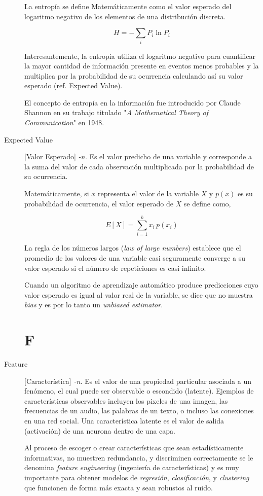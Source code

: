 \documentclass[twoside]{book}
\newcommand{\ditem}[1]{\item[#1] \markboth{\footnotesize \textbf{#1}}{\footnotesize \textbf{#1}}}
\begin{document}
\begin{multicols}{2}
\begin{description}
La entropía se define Matemáticamente como el valor esperado del logaritmo negativo de los elementos de una distribución discreta. 

$$H=-\sum _{i}P_{i}\ln {P_{i}}$$

Interesantemente, la entropía utiliza el logaritmo negativo para cuantificar la mayor cantidad de información presente en eventos menos probables y la multiplica por la probabilidad de su ocurrencia calculando así su valor esperado (ref. Expected Value).
  
El concepto de entropía en la información fue introducido por Claude Shannon en su trabajo titulado "\textit{A Mathematical Theory of Communication}" en 1948.

\ditem{Expected Value} [Valor Esperado] \textit{-n.} Es el valor predicho de una variable y corresponde a la suma del valor de cada observación multiplicada por la probabilidad de su ocurrencia.

Matemáticamente, si $x$ representa el valor de la variable $X$ y $p(x)$ es su probabilidad de ocurrencia, el valor esperado de $X$ se define como,

$$E [X]=\sum _{i=1}^{k}x_{i}\,p(x_{i})$$

La regla de los números largos (\textit{law of large numbers}) establece que el promedio de los valores de una variable casi seguramente converge a su valor esperado si el número de repeticiones es casi infinito. 

Cuando un algoritmo de aprendizaje automático produce predicciones cuyo  valor esperado es igual al valor real de la variable, se dice que no muestra \textit{bias} y es por lo tanto un \textit{unbiased estimator}.
\section{F}
\ditem{Feature} [Característica] \textit{-n.} Es el valor de una propiedad particular asociada a un fenómeno, el cual puede ser observable o escondido (latente). Ejemplos de características observables incluyen los pixeles de una imagen, las frecuencias de un audio, las palabras de un texto, o incluso las conexiones en una red social. Una característica latente es el valor de salida (activación) de una neurona dentro de una capa. 

Al proceso de escoger o crear características que sean estadísticamente informativas, no muestren redundancia, y discriminen correctamente se le denomina \textit{feature engineering} (ingeniería de características) y es muy importante para obtener modelos de \textit{regresión}, \textit{clasificación}, y \textit{clustering} que funcionen de forma más exacta y sean robustos al ruido. 


\end{description}
\end{multicols}
\end{document}
